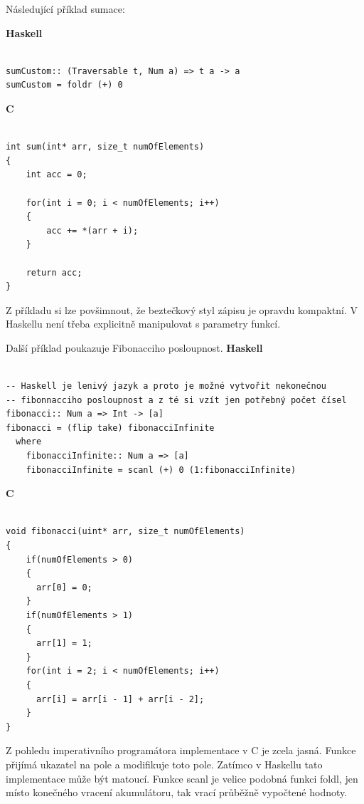 \documentclass[male,czech]{kithesis}
\begin{document}
Následující příklad sumace:

\textbf{Haskell}
\begin{verbatim}

sumCustom:: (Traversable t, Num a) => t a -> a
sumCustom = foldr (+) 0

\end{verbatim}

\textbf{C}
\begin{verbatim}

int sum(int* arr, size_t numOfElements)
{
    int acc = 0;
    
    for(int i = 0; i < numOfElements; i++)
    {
        acc += *(arr + i);
    }
    
    return acc;
}

\end{verbatim}
Z příkladu si lze povšimnout, 
že beztečkový styl zápisu je opravdu kompaktní. 
V Haskellu není třeba explicitně manipulovat s parametry funkcí.

Další příklad poukazuje Fibonacciho posloupnost.
\textbf{Haskell}
\begin{verbatim}

-- Haskell je lenivý jazyk a proto je možné vytvořit nekonečnou 
-- fibonnacciho posloupnost a z té si vzít jen potřebný počet čísel 
fibonacci:: Num a => Int -> [a]
fibonacci = (flip take) fibonacciInfinite
  where
    fibonacciInfinite:: Num a => [a]
    fibonacciInfinite = scanl (+) 0 (1:fibonacciInfinite)

\end{verbatim}


\textbf{C}
\begin{verbatim}

void fibonacci(uint* arr, size_t numOfElements)
{
    if(numOfElements > 0)
    {
      arr[0] = 0;
    }
    if(numOfElements > 1)
    {
      arr[1] = 1;
    }
    for(int i = 2; i < numOfElements; i++)
    {
      arr[i] = arr[i - 1] + arr[i - 2];
    }
}

\end{verbatim}

Z pohledu imperativního programátora implementace v C je zcela jasná. 
Funkce přijímá ukazatel na pole a modifikuje toto pole. 
Zatímco v Haskellu tato implementace může být matoucí. 
Funkce scanl je velice podobná funkci foldl, 
jen místo konečného vracení akumulátoru, 
tak vrací průběžně vypočtené hodnoty.
\end{document}
